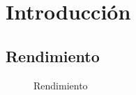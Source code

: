 \chapter{Introducción}
\label{cap:introduction}

\section{Rendimiento}

\begin{figure}[h]
    \centering
    
    \caption{Rendimiento}
\end{figure}
